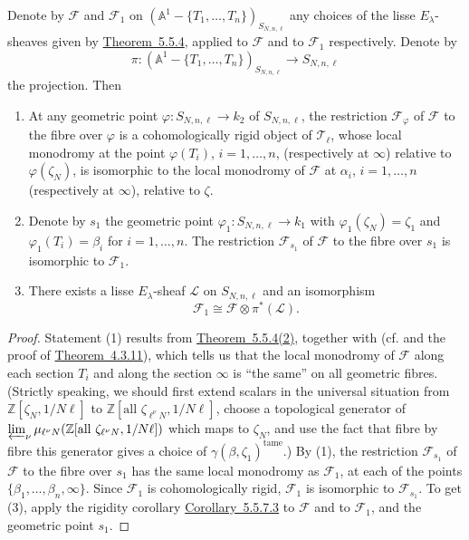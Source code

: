 Denote by \(\mathcal{F}\) and \(\mathcal{F}_1\) on
\((\mathbb{A}^1-\{T_1,\ldots,T_n\})_{S_{N,n,\ell}}\) any choices of the lisse
\(E_\lambda\)-sheaves given by \hyperref[thm:5.5.4]{Theorem~5.5.4}, applied
to \(\mathcal{F}\) and to \(\mathcal{F}_1\) respectively. Denote by
\[
  \pi:(\mathbb{A}^1-\{T_1,\ldots,T_n\})_{S_{N,n,\ell}}\to S_{N,n,\ell}
\]
the projection. Then
\begin{enumerate}[label=(\arabic*)]
\item At any geometric point \(\varphi:S_{N,n,\ell}\to k_2\) of
\(S_{N,n,\ell}\), the restriction \(\mathcal{F}_{\varphi}\) of
\(\mathcal{F}\) to the fibre over \(\varphi\) is a cohomologically rigid object
of \(\mathcal{T}_\ell\), whose local monodromy at the point \(\varphi(T_i)\),
\(i=1,\ldots,n\), (respectively at \(\infty\)) relative to
\(\varphi(\zeta_N)\), is isomorphic to the local monodromy of \(\mathcal{F}\)
at \(\alpha_i\), \(i=1,\ldots,n\) (respectively at \(\infty\)), relative to
\(\zeta\).

\item Denote by \(s_1\) the geometric point
\(\varphi_1:S_{N,n,\ell}\to k_1\) with \(\varphi_1(\zeta_N)=\zeta_1\) and
\(\varphi_1(T_i)=\beta_i\) for \(i=1,\ldots,n\). The restriction
\(\mathcal{F}_{s_1}\) of \(\mathcal{F}\) to the fibre over \(s_1\) is
isomorphic to \(\mathcal{F}_1\).

\item There exists a lisse \(E_\lambda\)-sheaf \(\mathcal{L}\) on
\(S_{N,n,\ell}\) and an isomorphism
\[
  \mathcal{F}_1\cong\mathcal{F}\otimes\pi^*(\mathcal{L}).
\]
\end{enumerate}

\begin{proof}
Statement (1) results from \hyperref[thm:5.5.4]{Theorem~5.5.4(2)}, together
with \cite[1.7.8]{De-WeilII} (cf. \cite[4.7.2]{Ka-SE} and the proof of
\hyperref[thm:4.3.11]{Theorem~4.3.11}), which tells us that the local
monodromy of \(\mathcal{F}\) along each section \(T_i\) and along the section
\(\infty\) is ``the same'' on all geometric fibres. (Strictly speaking, we
should first extend scalars in the universal situation from
\(\mathbb{Z}[\zeta_N,1/N\ell]\) to
\(\mathbb{Z}[\text{all }\zeta_{\ell^\nu N},1/N\ell]\), choose a topological
generator of
\(\varprojlim_\nu\mu_{\ell^\nu N}(\mathbb{Z}[\text{all }\zeta_{\ell^\nu N},1/N\ell])\)
which maps to \(\zeta_N\), and use the fact that fibre by fibre this generator
gives a choice of \(\gamma(\beta,\zeta_1)^{\mathrm{tame}}\).) By (1), the
restriction \(\mathcal{F}_{s_1}\) of \(\mathcal{F}\) to the fibre over \(s_1\)
has the same local monodromy as \(\mathcal{F}_1\), at each of the points
\(\{\beta_1,\ldots,\beta_n,\infty\}\). Since \(\mathcal{F}_1\) is
cohomologically rigid, \(\mathcal{F}_1\) is isomorphic to
\(\mathcal{F}_{s_1}\). To get (3), apply the rigidity corollary
\hyperref[cor:5.5.7.3]{Corollary~5.5.7.3} to \(\mathcal{F}\) and to
\(\mathcal{F}_1\), and the geometric point \(s_1\).
\end{proof}

